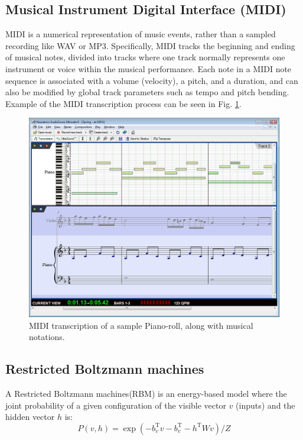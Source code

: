 \documentclass[letterpaper, 10 pt, conference]{ieeeconf}
\begin{document}
\subsection{Musical Instrument Digital Interface (MIDI)}
MIDI is a numerical representation of music events, rather than a sampled recording like WAV or MP3. Specifically, MIDI tracks the beginning and ending of musical notes, divided into tracks where one track normally represents one instrument or voice within the musical performance. Each note in a MIDI note sequence is associated with a volume (velocity), a pitch, and a duration, and can also be modified by global track parameters such as tempo and pitch bending. Example of the MIDI transcription process can be seen in Fig. \ref{fig:midi}.
\begin{figure}[thpb]
      \centering
      \includegraphics[scale=0.23]{trans.png}
      \caption{MIDI transcription of a sample Piano-roll, along with musical notations.}
      \label{fig:midi}
\end{figure}

\subsection{Restricted Boltzmann machines}
A Restricted Boltzmann machines(RBM) is an energy-based model where the joint probability of a given configuration of the visible vector $v$ (inputs) and the hidden vector $h$ is:
\begin{equation}
P(v,h) = \exp(-b_v^\textrm{T} v -b_v^\textrm{T} -h^\textrm{T}Wv )/Z
\end{equation}
\end{document}
